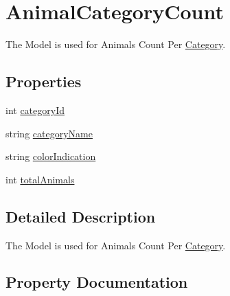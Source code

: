 \hypertarget{classWildlifeTrackingApp_1_1Models_1_1AnimalCategoryCount}{}\section{Animal\+Category\+Count}
\label{classWildlifeTrackingApp_1_1Models_1_1AnimalCategoryCount}


The Model is used for Animals Count Per \hyperlink{classWildlifeTrackingApp_1_1Models_1_1Category}{Category}.  


\subsection*{Properties}
\begin{DoxyCompactItemize}
\item 
int \hyperlink{classWildlifeTrackingApp_1_1Models_1_1AnimalCategoryCount_a423f91c56dc35040d661cfbe357f7c78}{category\+Id}
\item 
string \hyperlink{classWildlifeTrackingApp_1_1Models_1_1AnimalCategoryCount_a1eca787c85e1bc45b49bbd281d4106fd}{category\+Name}
\item 
string \hyperlink{classWildlifeTrackingApp_1_1Models_1_1AnimalCategoryCount_a0ecdefcc99a4b41b1ef3a04167756366}{color\+Indication}
\item 
int \hyperlink{classWildlifeTrackingApp_1_1Models_1_1AnimalCategoryCount_af2a3c76f434001a3f47c287cc16f04ff}{total\+Animals}
\end{DoxyCompactItemize}


\subsection{Detailed Description}
The Model is used for Animals Count Per \hyperlink{classWildlifeTrackingApp_1_1Models_1_1Category}{Category}. 



\subsection{Property Documentation}
\mbox{\label{classWildlifeTrackingApp_1_1Models_1_1AnimalCategoryCount_a423f91c56dc35040d661cfbe357f7c78}} 
